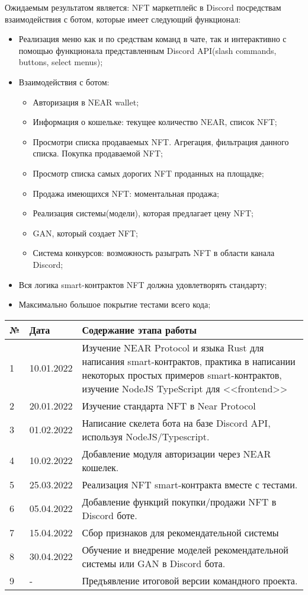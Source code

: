Ожидаемым результатом является: NFT маркетплейс в Discord посредствам взаимодействия с ботом, которые имеет следующий функционал:
\begin{itemize}
    \item Реализация меню как и по средствам команд в чате, так и интерактивно с помощью функционала представленным Discord API(slash commands, buttons, select menus);
    \item Взаимодействия с ботом:
    \begin{itemize}
        \item Авторизация в NEAR wallet;
        \item Информация о кошельке: текущее количество NEAR, список NFT;
        \item Просмотри списка продаваемых NFT. Агрегация, фильтрация данного списка. Покупка продаваемой NFT;
        \item Просмотр списка самых дорогих NFT проданных на площадке;
        \item Продажа имеющихся NFT: моментальная продажа;
        \item Реализация системы(модели), которая предлагает цену NFT;
        \item GAN, который создает NFT;
        \item Система конкурсов: возможность разыграть NFT в области канала Discord;
    \end{itemize}
    \item Вся логика smart-контрактов NFT должна удовлетворять стандарту;
    \item Максимально большое покрытие тестами всего кода;
\end{itemize}

\begin{tabular}{|p{0.2cm}|p{7.5cm}|p{7.5cm}|}
    \hline
    №& Дата& Содержание этапа работы\\\hline
    1& 10.01.2022& Изучение NEAR Protocol и языка Rust для написания smart-контрактов, практика в написании некоторых простых примеров smart-контрактов, изучение NodeJS TypeScript для <<frontend>>\\\hline
    2& 20.01.2022& Изучение стандарта NFT в Near Protocol\\\hline
    3& 01.02.2022& Написание скелета бота на базе Discord API, используя NodeJS/Typescript.\\\hline
    4& 10.02.2022& Добавление модуля авторизации через NEAR кошелек.\\\hline
    5& 25.03.2022& Реализация NFT smart-контракта вместе с тестами.\\\hline
    6& 05.04.2022&Добавление функций покупки/продажи NFT в Discord боте.\\\hline
    7& 15.04.2022& Сбор признаков для рекомендательной системы\\\hline
    8& 30.04.2022& Обучение и внедрение моделей рекомендательной системы или GAN в
    Discord бота.\\\hline
    9& -& Предъявление итоговой версии командного проекта.\\\hline

\end{tabular}